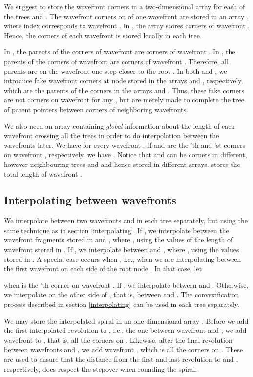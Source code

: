 \documentclass[3p]{elsarticle}
\begin{document}
We suggest to store the wavefront corners in a two-dimensional array for each of the trees
 and .
The wavefront corners on  of one wavefront are stored in an array ,
where index  corresponds to wavefront .
In , the array  stores corners of
wavefront .
Hence, the corners of each wavefront is stored locally in each tree .

In , the parents of the corners of wavefront 
are corners of wavefront . In , the parents of the corners of wavefront
 are corners of wavefront .
Therefore, all parents are on the
wavefront one step closer to the root .
In both  and , we introduce fake wavefront corners
at node  stored in the arrays  and ,
respectively, which are the parents of the corners in
the arrays  and .
Thus, these fake corners are not corners on wavefront  for any , but are merely
made to complete the tree of parent pointers between corners of neighboring wavefronts.

We also need an array  containing \emph{global} information about the length
of each wavefront crossing all the trees  in order to do interpolation between
the wavefronts later. We have
 for every wavefront .
If  and  are the 'th and 'st corners on
wavefront , respectively, we have
. Notice that  and  can be corners
in different, however neighbouring trees  and  and hence stored in
different arrays.
 stores the total length of wavefront .

\subsection{Interpolating between wavefronts}\label{interpolWithIsland}

We interpolate between two wavefronts  and  in each tree  separately,
but using the same technique as in section \ref{interpolating}. If
, we interpolate between the
wavefront fragments stored in
 and ,
where , using the values of the length of wavefront  stored in
.
If , we interpolate between
 and ,
where , using the values stored in .
A special case occurs when
, i.e.,
when we are interpolating between the first wavefront on each side of the root node .
In that case, let

when  is the 'th corner on wavefront .
If , we interpolate between  and .
Otherwise, we interpolate on the other side of , that is,
between  and .
The convexification process described in section \ref{interpolating} can be used in each
tree  separately.

We may store the interpolated spiral in an one-dimensional array .
Before we add the first interpolated revolution to , i.e., the one between wavefront  and ,
we add wavefront  to , that is, all the corners on . Likewise,
after the final revolution between wavefronts  and , we add wavefront , which is
all the corners on . These are used to ensure that the distance from the
first and last revolution to  and , respectively,
does respect the stepover when rounding the spiral.
\end{document}
